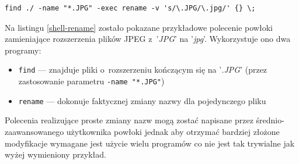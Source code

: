 \begin{lstlisting}[label=shell-rename, caption={Polecenie powłoki zmieniające roszerzenia plików JPEG}]
find ./ -name "*.JPG" -exec rename -v 's/\.JPG/\.jpg/' {} \;
\end{lstlisting}

\par
Na listingu \ref{shell-rename} zostało pokazane przykładowe polecenie powłoki zamieniające rozszerzenia plików JPEG z~'\textit{JPG}' na '\textit{jpg}'.
Wykorzystuje ono dwa programy:
\begin{itemize}
\item \texttt{find} --- znajduje pliki o~rozszerzeniu kończącym się na '\textit{.JPG}' (przez zastosowanie parametru \texttt{-name "*.JPG"})
\item \texttt{rename} --- dokonuje faktycznej zmiany nazwy dla pojedynczego pliku
\end{itemize}
Polecenia realizujące proste zmiany nazw mogą zostać napisane przez średnio-zaawansowanego użytkownika powłoki jednak aby otrzymać bardziej złożone modyfikacje wymagane jest użycie wielu programów co nie jest tak trywialne jak wyżej wymieniony przykład.

